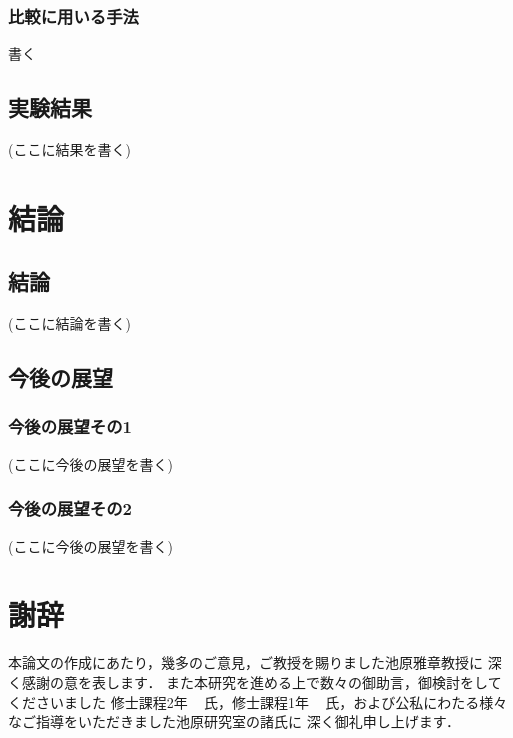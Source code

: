 \documentclass[dvipdfmx,report,disablejfam,nosetpagesize,12pt]{jsbook}
\begin{document}
\subsection{比較に用いる手法}
書く

\section{実験結果}
(ここに結果を書く)

\chapter{結論}
\section{結論}
(ここに結論を書く)

\section{今後の展望}
\subsection{今後の展望その1}
(ここに今後の展望を書く)

\subsection{今後の展望その2}
(ここに今後の展望を書く)

\chapter*{謝辞}
本論文の作成にあたり，幾多のご意見，ご教授を賜りました池原雅章教授に
深く感謝の意を表します．
また本研究を進める上で数々の御助言，御検討をしてくださいました
修士課程2年
\textbigcircle\,\textbigcircle\,\textbigcircle\,\textbigcircle
氏，修士課程1年
\textbigcircle\,\textbigcircle\,\textbigcircle\,\textbigcircle
氏，および公私にわたる様々なご指導をいただきました池原研究室の諸氏に
深く御礼申し上げます．


%

\end{document}
